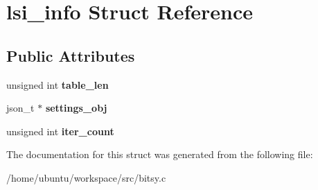 \hypertarget{structlsi__info}{\section{lsi\-\_\-info Struct Reference}
\label{structlsi__info}
}
\subsection*{Public Attributes}
\begin{DoxyCompactItemize}
\item 
\hypertarget{structlsi__info_a5c66ebbfb1526c92c68fb5ac403acf0b}{unsigned int {\bfseries table\-\_\-len}}\label{structlsi__info_a5c66ebbfb1526c92c68fb5ac403acf0b}

\item 
\hypertarget{structlsi__info_a450da3539ae79eb9373857897d0c63a1}{json\-\_\-t $\ast$ {\bfseries settings\-\_\-obj}}\label{structlsi__info_a450da3539ae79eb9373857897d0c63a1}

\item 
\hypertarget{structlsi__info_a154a97e557122436a68d31bd447810fa}{unsigned int {\bfseries iter\-\_\-count}}\label{structlsi__info_a154a97e557122436a68d31bd447810fa}

\end{DoxyCompactItemize}


The documentation for this struct was generated from the following file\-:\begin{DoxyCompactItemize}
\item 
/home/ubuntu/workspace/src/bitsy.\-c\end{DoxyCompactItemize}
